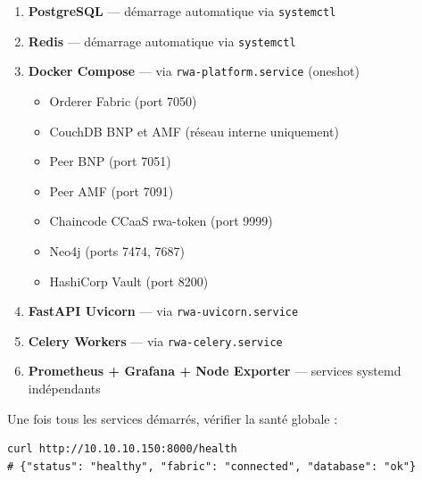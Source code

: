 \documentclass[12pt,a4paper,french]{article}
\begin{document}
\begin{enumerate}[leftmargin=2cm, label=\textbf{Étape \arabic*.}]
  \item \textbf{PostgreSQL} — démarrage automatique via \texttt{systemctl}
  \item \textbf{Redis} — démarrage automatique via \texttt{systemctl}
  \item \textbf{Docker Compose} — via \texttt{rwa-platform.service} (oneshot)
  \begin{itemize}
    \item Orderer Fabric (port 7050)
    \item CouchDB BNP et AMF (réseau interne uniquement)
    \item Peer BNP (port 7051)
    \item Peer AMF (port 7091)
    \item Chaincode CCaaS rwa-token (port 9999)
    \item Neo4j (ports 7474, 7687)
    \item HashiCorp Vault (port 8200)
  \end{itemize}
  \item \textbf{FastAPI Uvicorn} — via \texttt{rwa-uvicorn.service}
  \item \textbf{Celery Workers} — via \texttt{rwa-celery.service}
  \item \textbf{Prometheus + Grafana + Node Exporter} — services systemd indépendants
\end{enumerate}

\begin{successbox}
Une fois tous les services démarrés, vérifier la santé globale :
\begin{verbatim}
curl http://10.10.10.150:8000/health
# {"status": "healthy", "fabric": "connected", "database": "ok"}
\end{verbatim}
\end{successbox}
\end{document}
